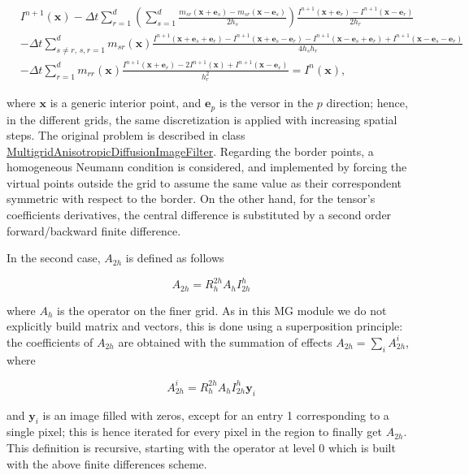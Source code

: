 \begin{eqnarray*} & I^{n+1}(\mathbf{x}) - \Delta t \sum \limits_{r=1}^d \left( \sum \limits_{s=1}^d \frac{m_{sr}(\mathbf{x} + \mathbf{e}_s) - m_{sr}(\mathbf{x} - \mathbf{e}_s)}{2h_s} \right) \frac{I^{n+1}(\mathbf{x} + \mathbf{e}_r) - I^{n+1}(\mathbf{x} - \mathbf{e}_r)}{2h_r} \\ & - \Delta t \sum \limits_{s \neq r,\, s,r=1}^d m_{sr}(\mathbf{x}) \frac{I^{n+1}(\mathbf{x} + \mathbf{e}_s + \mathbf{e}_r) - I^{n+1}(\mathbf{x} + \mathbf{e}_s - \mathbf{e}_r) - I^{n+1}(\mathbf{x} - \mathbf{e}_s + \mathbf{e}_r) + I^{n+1}(\mathbf{x} - \mathbf{e}_s - \mathbf{e}_r) }{4h_s h_r} \\ & - \Delta t \sum \limits_{r=1}^d m_{rr}(\mathbf{x}) \frac{I^{n+1}(\mathbf{x} + \mathbf{e}_r ) - 2I^{n+1}(\mathbf{x}) + I^{n+1}(\mathbf{x} - \mathbf{e}_r ) }{h^2_r} = I^n(\mathbf{x}), \end{eqnarray*}

where $ \mathbf{x} $ is a generic interior point, and $ \mathbf{e}_p $ is the versor in the $ p $ direction; hence, in the different grids, the same discretization is applied with increasing spatial steps. The original problem is described in class \hyperlink{classitk_1_1_multigrid_anisotropic_diffusion_image_filter}{Multigrid\-Anisotropic\-Diffusion\-Image\-Filter}. Regarding the border points, a homogeneous Neumann condition is considered, and implemented by forcing the virtual points outside the grid to assume the same value as their correspondent symmetric with respect to the border. On the other hand, for the tensor's coefficients derivatives, the central difference is substituted by a second order forward/backward finite difference.

In the second case, $ A_{2h} $ is defined as follows

\[ A_{2h} = R_h^{2h} A_h I_{2h}^h \]

where $ A_h $ is the operator on the finer grid. As in this M\-G module we do not explicitly build matrix and vectors, this is done using a superposition principle\-: the coefficients of $ A_{2h} $ are obtained with the summation of effects $ A_{2h} = \sum \limits_i A^i_{2h} $, where

\[ A^i_{2h} = R_h^{2h} A_h I_{2h}^h \mathbf{y}_i \]

and $ \mathbf{y}_i $ is an image filled with zeros, except for an entry 1 corresponding to a single pixel; this is hence iterated for every pixel in the region to finally get $ A_{2h} $. This definition is recursive, starting with the operator at level 0 which is built with the above finite differences scheme.

